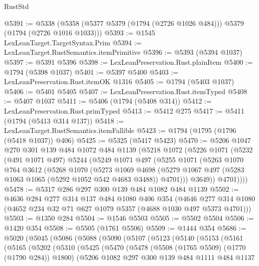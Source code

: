 \begin{lexlean}{RustStd}
\begin{coremodule}
@5391 := @5338 (@5358 (@5377 @5379 (@1794 (@2726 @1026 @484))) @5379 (@1794 (@2726 @1016 @1033)))
@5393 := @1545 LexLeanTarget.TargetSyntax.Prim
@5394 := LexLeanTarget.RustSemantics.itemPrimitive
@5396 := @5393 (@5394 @1037)
@5397 := @5391 @5396
@5398 := LexLeanPreservation.Rust.plainItem
@5400 := @1794 (@5398 @1037)
@5401 := @5397 @5400
@5403 := LexLeanPreservation.Rust.itemOK @1316
@5405 := @1794 (@5403 @1037)
@5406 := @5401 @5405
@5407 := LexLeanPreservation.Rust.itemTyped
@5408 := @5407 @1037
@5411 := @5406 (@1794 (@5408 @314))
@5412 := LexLeanPreservation.Rust.primTyped
@5413 := @5412 @275
@5417 := @5411 (@1794 (@5413 @314 @137))
@5418 := LexLeanTarget.RustSemantics.itemFallible
@5423 := @1794 (@1795 (@1796 (@5418 @1037)) @406)
@5425 := @5325 (@5417 @5423)
@5470 := @5206
    @1047
    @270
    @301
    @139
    @484
    @1072
    @484
    @1139
    (@5218
      @1072
      (@5226
        @1071
        (@5232
          (@491 @1071 @497)
          @5244
          (@5249
            @1071
            @497
            (@5255
              @1071
              (@5263
                @1070
                @764
                @3612
                (@5268
                  @1070
                  (@5273
                    @1069
                    @4698
                    (@5279 @1067 @497 (@5283 @1063 @1065 (@5292 @1052 @542 @4683 @3488)) @4701)))
                @3649))
            @4701))))
@5478 := @5317 @286 @297 @300 @139 @484 @1082 @484 @1139
@5502 := @4636
    @284
    @277
    @314
    @137
    @484
    @1080
    @406
    @354
    (@4646 @277 @314 @1080 (@4652 @234 @32 @71 @627 @1079 @5357 (@4688 @1030 @497 @5373 @4701)))
@5503 := @1350 @284
@5504 := @1546 @5503
@5505 := @5502 @5504
@5506 := @1420 @354
@5508 := @5505 (@1761 @5506)
@5509 := @1444 @354
@5686 := @5020
    (@5045
      (@5086
        (@5088
          (@5090
            (@5107
              (@5123
                (@5140
                  (@5153
                    (@5161
                      (@5165
                        (@5202
                          (@5310
                            (@5425
                              (@5470
                                (@5478
                                  (@5508 (@1765 @5509) (@1770 (@1790 @284)) @1800)
                                  (@5206
                                    @1082
                                    @297
                                    @300
                                    @139
                                    @484
                                    @1111
                                    @484
                                    @1137

\end{coremodule}
\end{lexlean}
